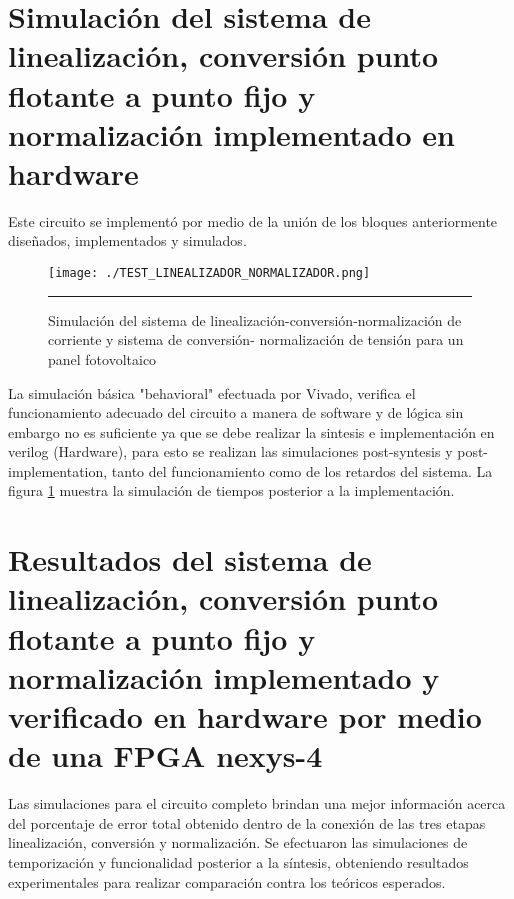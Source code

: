 \section{Simulación del sistema de linealización, conversión punto flotante a punto fijo y normalización implementado en hardware}

Este circuito se implementó por medio de la unión de los bloques anteriormente diseñados, implementados y simulados. 

\begin{figure}[H]
  \centering
    \texttt{[image: ./TEST\_LINEALIZADOR\_NORMALIZADOR.png]}
    \rule{35em}{0.5pt}
  \caption[Simulación del sistema de linealización-conversión-normalización de corriente y sistema de conversión- normalización de tensión para un panel fotovoltaico]{Simulación del sistema de linealización-conversión-normalización de corriente y sistema de conversión- normalización de tensión para un panel fotovoltaico}
  \label{fig:Sim_Sist}
\end{figure}

La simulación básica "behavioral" efectuada por Vivado, verifica el funcionamiento adecuado del circuito a manera de software y de lógica sin embargo no es suficiente ya que se debe realizar la sintesis e implementación en verilog (Hardware), para esto se realizan las simulaciones post-syntesis y post-implementation, tanto del funcionamiento como de los retardos del sistema. La figura \ref{fig:Sim_Sist} muestra la simulación de tiempos posterior a la implementación.

\section{Resultados del sistema de linealización, conversión punto flotante a punto fijo y normalización implementado y verificado en hardware por medio de una FPGA nexys-4}

Las simulaciones para el circuito completo brindan una mejor información acerca del porcentaje de error total obtenido dentro de la conexión de las tres etapas  linealización, conversión y normalización. Se efectuaron las simulaciones de temporización y funcionalidad posterior a la síntesis, obteniendo resultados experimentales para realizar comparación contra los teóricos esperados.      
 
